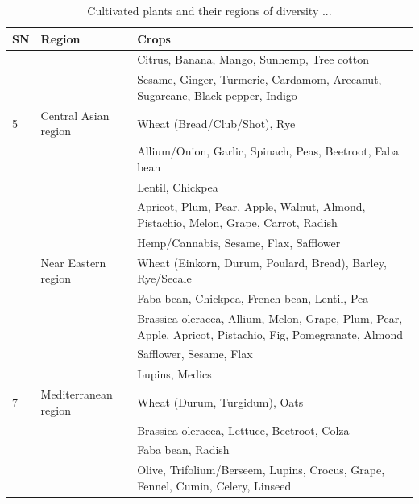 \documentclass[11pt,ignorenonframetext,aspectratio=169]{beamer}
\begin{document}
\begin{frame}{}
\protect\hypertarget{section-9}{}
\begin{table}

\caption{\label{tab:cultivated-megacentres-tab2}Cultivated plants and their regions of diversity ...}
\centering
\fontsize{6}{8}\selectfont
\begin{tabular}[t]{>{\raggedleft\arraybackslash}p{4em}>{\raggedleft\arraybackslash}p{14em}>{\raggedleft\arraybackslash}p{28em}}
\toprule
SN & Region & Crops\\
\midrule
\rowcolor{gray!6}   &  & Citrus, Banana, Mango, Sunhemp, Tree cotton\\
 &  & Sesame, Ginger, Turmeric, Cardamom, Arecanut, Sugarcane, Black pepper, Indigo\\
\rowcolor{gray!6}  5 & Central Asian region & Wheat (Bread/Club/Shot), Rye\\
 &  & Allium/Onion, Garlic, Spinach, Peas, Beetroot, Faba bean\\
\rowcolor{gray!6}   &  & Lentil, Chickpea\\
\addlinespace
 &  & Apricot, Plum, Pear, Apple, Walnut, Almond, Pistachio, Melon, Grape, Carrot, Radish\\
\rowcolor{gray!6}   &  & Hemp/Cannabis, Sesame, Flax, Safflower\\
6 & Near Eastern region & Wheat (Einkorn, Durum, Poulard, Bread), Barley, Rye/Secale\\
\rowcolor{gray!6}   &  & Faba bean, Chickpea, French bean, Lentil, Pea\\
 &  & Brassica oleracea, Allium, Melon, Grape, Plum, Pear, Apple, Apricot, Pistachio, Fig, Pomegranate, Almond\\
\addlinespace
\rowcolor{gray!6}   &  & Safflower, Sesame, Flax\\
 &  & Lupins, Medics\\
\rowcolor{gray!6}  7 & Mediterranean region & Wheat (Durum, Turgidum), Oats\\
 &  & Brassica oleracea, Lettuce, Beetroot, Colza\\
\rowcolor{gray!6}   &  & Faba bean, Radish\\
\addlinespace
 &  & Olive, Trifolium/Berseem, Lupins, Crocus, Grape, Fennel, Cumin, Celery, Linseed\\
\bottomrule
\end{tabular}
\end{table}
\end{frame}
\end{document}
